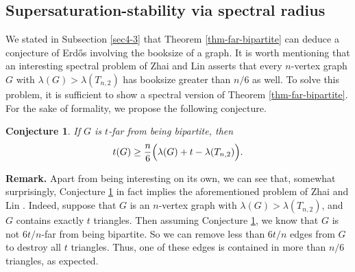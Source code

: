 \documentclass[11pt]{article}
\newtheorem{conjecture}[theorem]{Conjecture}
\begin{document}
\subsection{Supersaturation-stability via spectral radius}
We stated in Subsection \ref{sec4-3} that 
Theorem \ref{thm-far-bipartite} can deduce a conjecture 
of Erd\H{o}s involving the booksize of a graph. 
It is worth mentioning that an interesting spectral problem 
of Zhai and Lin \cite[Problem 1.2]{ZL2022jgt} asserts that 
every $n$-vertex graph $G$ with 
$\lambda (G) > \lambda (T_{n,2})$ has booksize greater than $n/6$ as well. 
To solve this problem, 
it is sufficient to show a spectral version of 
Theorem \ref{thm-far-bipartite}. 
For the sake of formality, we propose the following conjecture. 

\begin{conjecture} \label{conj-spec-far}
If $G$ is $t$-far from being bipartite, then 
\[  t(G) \ge \frac{n}{6}\Bigl( \lambda(G) + t - \lambda (T_{n,2}) \Bigr). \]
\end{conjecture}


\noindent 
{\bf Remark.} 
Apart from being interesting on its own, we can see that, somewhat surprisingly, 
Conjecture \ref{conj-spec-far} in fact implies the aforementioned problem of Zhai and Lin \cite[Problem 1.2]{ZL2022jgt}. 
Indeed, suppose that $G$ is an $n$-vertex graph with $\lambda (G)> \lambda (T_{n,2})$, and 
$G$ contains exactly $t$ triangles.  
Then assuming Conjecture \ref{conj-spec-far}, we know that 
$G$ is not ${6t}/{n}$-far from being bipartite. 
So we can remove less than ${6t}/{n}$ edges from $G$ to destroy all $t$ triangles. 
Thus,  one of these edges is contained in more than $n/6$ triangles, as expected. 
\end{document}
